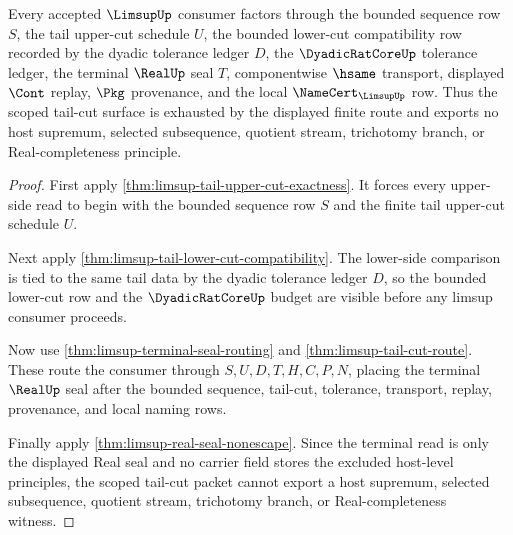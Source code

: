 \begin{theorem}
\label{thm:limsup-scoped-tail-cut-exhaustion}
Every accepted $\LimsupUp$ consumer factors through the bounded sequence row $S$, the tail upper-cut schedule $U$, the bounded lower-cut compatibility row recorded by the dyadic tolerance ledger $D$, the $\DyadicRatCoreUp$ tolerance ledger, the terminal $\RealUp$ seal $T$, componentwise $\hsame$ transport, displayed $\Cont$ replay, $\Pkg$ provenance, and the local $\NameCert_{\LimsupUp}$ row. Thus the scoped tail-cut surface is exhausted by the displayed finite route and exports no host supremum, selected subsequence, quotient stream, trichotomy branch, or Real-completeness principle.
\end{theorem}
\begin{proof}
First apply \autoref{thm:limsup-tail-upper-cut-exactness}. It forces every upper-side read to begin with the bounded sequence row $S$ and the finite tail upper-cut schedule $U$.

Next apply \autoref{thm:limsup-tail-lower-cut-compatibility}. The lower-side comparison is tied to the same tail data by the dyadic tolerance ledger $D$, so the bounded lower-cut row and the $\DyadicRatCoreUp$ budget are visible before any limsup consumer proceeds.

Now use \autoref{thm:limsup-terminal-seal-routing} and \autoref{thm:limsup-tail-cut-route}. These route the consumer through $S,U,D,T,H,C,P,N$, placing the terminal $\RealUp$ seal after the bounded sequence, tail-cut, tolerance, transport, replay, provenance, and local naming rows.

Finally apply \autoref{thm:limsup-real-seal-nonescape}. Since the terminal read is only the displayed Real seal and no carrier field stores the excluded host-level principles, the scoped tail-cut packet cannot export a host supremum, selected subsequence, quotient stream, trichotomy branch, or Real-completeness witness.
\end{proof}

